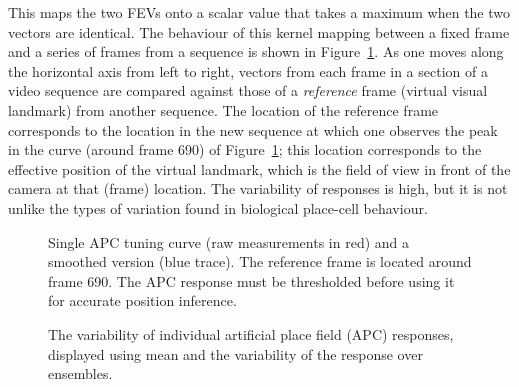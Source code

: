 This maps the two FEVs onto a scalar value that takes a maximum when the two vectors are identical. The behaviour of this kernel mapping between a fixed frame and a series of frames from a sequence is shown in Figure~\ref{fig:APCSingleNoisy}.  As one moves along the horizontal axis from left to right, vectors from each frame in a section of a video sequence are compared against those of a {\em reference} frame (virtual visual landmark) from another sequence.  The location of the reference frame corresponds to the location in the new sequence at which one observes the peak in the curve (around frame 690) of Figure~\ref{fig:APCSingleNoisy}; this location corresponds to the effective position of the virtual landmark, which is the field of view in front of the camera at that (frame) location.  The variability of responses is high, but it is not unlike the types of variation found in biological place-cell behaviour.  


%		

\begin{figure}[t]
\centering
 \setlength{}
	\setlength{}
		
\caption{Single APC tuning curve (raw measurements in red) and a smoothed version (blue trace).  The reference frame is located around frame 690. The APC response must be thresholded before using it for accurate position inference.}
\label{fig:APCSingleNoisy}
\end{figure}


\begin{figure}
  \centering
  \setlength{}
  \setlength{}
  
  \caption{The variability of individual artificial place field (APC) responses, displayed using mean and the variability of the response over ensembles.}
  \label{fig:APCVariability}
\end{figure}



